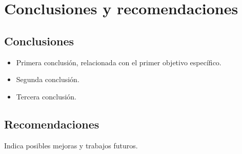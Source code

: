 \chapter{Conclusiones y recomendaciones}
\label{cap:conclusiones}

\section{Conclusiones}
\begin{itemize}
  \item Primera conclusión, relacionada con el primer objetivo específico.
  \item Segunda conclusión.
  \item Tercera conclusión.
\end{itemize}

\section{Recomendaciones}
Indica posibles mejoras y trabajos futuros.
